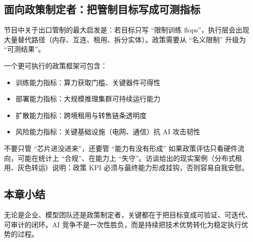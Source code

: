 \subsection{面向政策制定者：把管制目标写成可测指标}

节目中关于出口管制的最大启发是：若目标只写 ``限制训练 flops''，执行层会出现大量替代路径（内存、互连、租用、拆分实体）。政策需要从 ``名义限制'' 升级为 ``可测结果''。

一个更可执行的政策框架可包含：
\begin{itemize}
    \item 训练能力指标：算力获取门槛、关键器件可得性
    \item 部署能力指标：大规模推理集群可持续运行能力
    \item 扩散能力指标：跨境租用与转售链条透明度
    \item 风险能力指标：关键基础设施（电网、通信）抗 AI 攻击韧性
\end{itemize}

\begin{warningbox}{不要只管 ``芯片进没进来''，还要管 ``能力有没有形成''}
如果政策评估只看硬件流向，可能在统计上 ``合规''、在能力上 ``失守''。访谈给出的现实案例（分布式租用、灰色转运）说明：政策 KPI 必须与最终能力形成挂钩，否则容易自我安慰。
\end{warningbox}

\subsection{本章小结}

无论是企业、模型团队还是政策制定者，关键都在于把目标变成可验证、可迭代、可审计的闭环。AI 竞争不是一次性胜负，而是持续把技术优势转化为稳定执行优势的过程。

